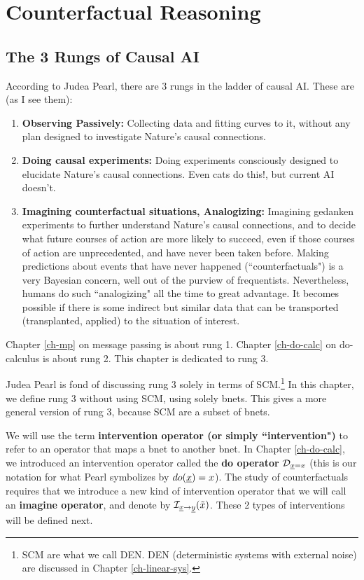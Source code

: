 \chapter{Counterfactual Reasoning}
\label{ch-counterf}


\section{The 3 Rungs of Causal AI}
According to 
Judea Pearl,
there are 3 rungs in the
ladder of causal AI.
These are (as I see them):
\begin{enumerate}
\item
{\bf Observing Passively:} Collecting 
data
and fitting curves to it,
without any plan 
designed to
investigate Nature's 
causal connections.
\item {\bf Doing causal
experiments:} 
Doing experiments 
consciously designed to
elucidate
Nature's causal connections.
Even cats do this!, but current AI doesn't.
\item {\bf Imagining
 counterfactual situations, Analogizing:}
Imagining gedanken experiments
to further understand
Nature's causal connections,
and to decide what future
courses of action are
more likely to succeed,
even if
those courses of action
are unprecedented, and have never been taken before.
Making
predictions about
 events that have never happened (``counterfactuals")
is a very Bayesian
concern, well out of the purview of 
frequentists. Nevertheless,
humans do such
``analogizing" 
all the time to great advantage.
It becomes
possible if there
is some indirect but similar
data that can be transported
(transplanted, applied)
to the situation of
interest.
\end{enumerate}
Chapter \ref{ch-mp}
on message passing
is about rung 1.
Chapter \ref{ch-do-calc}
on do-calculus is about rung 2.
This chapter is dedicated to rung 3.

Judea Pearl 
is fond of discussing rung 3 solely
in terms of SCM.\footnote{SCM are 
what we call DEN. DEN (deterministic systems
with external noise) are discussed in
Chapter \ref{ch-linear-sys}. }
In this chapter,
we define rung 3
without using SCM, using solely
bnets.
This gives a more general
version of rung 3,
because SCM are a subset of bnets.



We will use the
term {\bf intervention operator (or simply ``intervention")} 
to refer to an operator
that maps a bnet to another bnet.
In Chapter \ref{ch-do-calc},
we introduced an intervention operator
 called the {\bf do operator}
${\cal D}_{{\underline{x}}=x}$ (this is our notation for what Pearl 
symbolizes by $do({\underline{x}})=x$).
The study of counterfactuals 
requires that we
introduce a new
kind of intervention 
operator that we will
call an {\bf imagine operator},
and denote by ${\cal I}_{{\underline{x}}\rightarrow{\underline{y}}}(\tilde{x})$.
These 2 types of interventions 
will be defined 
next.

